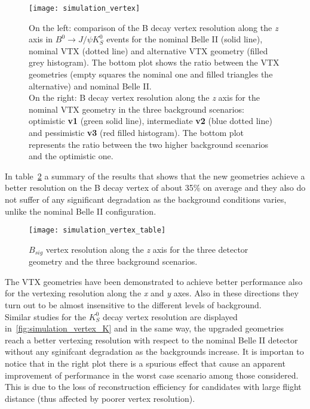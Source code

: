 \begin{figure}[h!]
\centering
\texttt{[image: simulation\_vertex]}
\caption{On the left: comparison of the B decay vertex resolution along the \textit{z} axis in $B^{0} \rightarrow J/\psi K_{S}^{0}$ events for the nominal Belle II (solid line), nominal VTX (dotted line) and alternative VTX geometry (filled grey histogram). The bottom plot shows the ratio between the VTX geometries (empty squares the nominal one and filled triangles the alternative) and nominal Belle II. \\
On the right:  B decay vertex resolution along the \textit{z} axis for the nominal VTX geometry in the three background scenarios: optimistic \textbf{v1} (green solid line), intermediate \textbf{v2} (blue dotted line) and pessimistic \textbf{v3} (red filled histogram). The bottom plot represents the ratio between the two higher background scenarios and the optimistic one.}
\label{fig:simulation_vertex}
\end{figure}

In table~\ref{fig:simulation_vertex_table} a summary of the results that shows that the new geometries achieve a better resolution on the B decay vertex of about 35\% on average and they also do not suffer of any significant degradation as the background conditions varies, unlike the nominal Belle II configuration.


\begin{figure}[h!]
\centering
\texttt{[image: simulation\_vertex\_table]}
\caption{$B_{sig}$ vertex resolution along the \textit{z} axis for the three detector geometry and the three background scenarios.}
\label{fig:simulation_vertex_table}
\end{figure}

The VTX geometries have been demonstrated to achieve better performance also for the vertexing resolution along the \textit{x} and \textit{y} axes. Also in these directions they turn out to be almost insensitive to the different levels of background.\\

Similar studies for the $K_{S}^{0}$ decay vertex resolution are displayed in~\autoref{fig:simulation_vertex_K} and in the same way, the upgraded geometries reach a better vertexing resolution with respect to the nominal Belle II detector without any sginifcant degradation as the backgrounds increase.
It is importan to notice that in the right plot there is a spurious effect that cause an apparent improvement of performance in the worst case scenario among those considered. This is due to the loss of reconstruction efficiency for candidates with large flight distance (thus affected by poorer vertex resolution).

